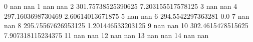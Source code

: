 0 nan nan
1 nan nan
2 301.75738525390625 7.203155517578125
3 nan nan
4 297.1603698730469 2.60614013671875
5 nan nan
6 294.5542297363281 0.0
7 nan nan
8 295.75567626953125 1.201446533203125
9 nan nan
10 302.4615478515625 7.907318115234375
11 nan nan
12 nan nan
13 nan nan
14 nan nan
